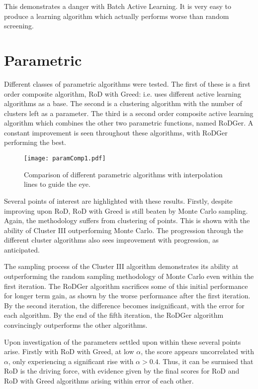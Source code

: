This demonstrates a danger with Batch Active Learning. It is very easy to produce a learning algorithm which actually performs worse than random screening.

\section{Parametric}
Different classes of parametric algorithms were tested. The first of these is a first order composite algorithm, RoD with Greed: i.e. uses different active learning algorithms as a base. The second is a clustering algorithm with the number of clusters left as a parameter. The third is a second order composite active learning algorithm which combines the other two parametric functions, named RoDGer. A constant improvement is seen throughout these algorithms, with RoDGer performing the best.

\begin{figure}[h]
    \begin{center}
        \texttt{[image: paramComp1.pdf]}
        \caption[Parametric Comparison]{Comparison of different parametric algorithms with interpolation lines to guide the eye.}
        \label{fig:pComp}
    \end{center}
\end{figure}

Several points of interest are highlighted with these results. Firstly, despite improving upon RoD, RoD with Greed is still beaten by Monte Carlo sampling. Again, the methodology suffers from clustering of points. This is shown with the ability of Cluster III outperforming Monte Carlo. The progression through the different cluster algorithms also sees improvement with progression, as anticipated.

The sampling process of the Cluster III algorithm demonstrates its ability at outperforming the random sampling methodology of Monte Carlo even within the first iteration. The RoDGer algorithm sacrifices some of this initial performance for longer term gain, as shown by the worse performance after the first iteration. By the second iteration, the difference becomes insignificant, with the error for each algorithm. By the end of the fifth iteration, the RoDGer algorithm convincingly outperforms the other algorithms.

Upon investigation of the parameters settled upon within these several points arise. Firstly with RoD with Greed, at low $\alpha$, the score appears uncorrelated with $\alpha$, only experiencing a significant rise with $\alpha{}>0.4$. Thus, it can be surmised that RoD is the driving force, with evidence given by the final scores for RoD and RoD with Greed algorithms arising within error of each other.

